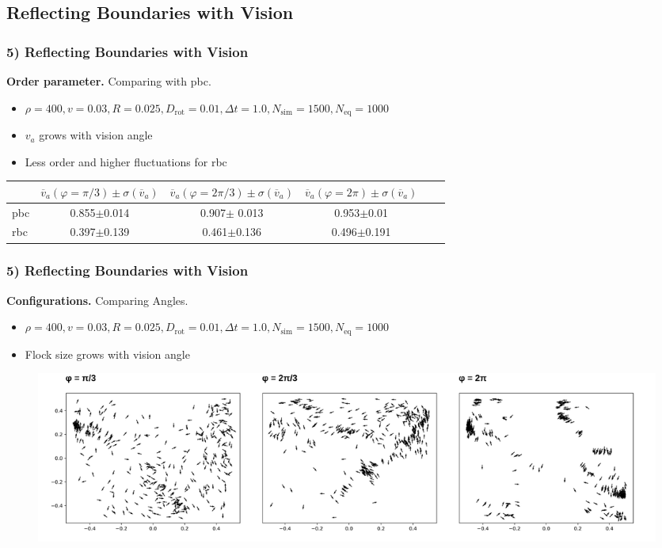 \subsection{Reflecting Boundaries with Vision}

\begin{frame}
	\frametitle{5) Reflecting Boundaries with Vision}
	\textbf{Order parameter.} Comparing with pbc.
	\begin{itemize}
	    \item $\rho = 400, v = 0.03, R = 0.025, D_{\text{rot}} = 0.01, \Delta t = 1.0, N_{\text{sim}} = 1500, N_{\text{eq}} = 1000$
	    \item $v_a$ grows with vision angle
	    \item Less order and higher fluctuations for rbc
	\end{itemize}
	\begin{table}[H]
  		\centering
      
  		\begin{tabular}{@{}l|cccp{4.5cm}l@{}}
    		\toprule
       			& $\overline{v}_a\left(\varphi = \pi/3\right)\pm\sigma\left(\overline{v}_a\right)$ & $\overline{v}_a\left(\varphi = 2\pi/3\right)\pm\sigma\left(\overline{v}_a\right)$ & $\overline{v}_a\left(\varphi = 2\pi\right)\pm\sigma\left(\overline{v}_a\right)$\\ \midrule
       		pbc	& \num{0.855}$\pm$\num{0.014} & \num{0.907}$\pm$ \num{0.013} & \num{0.953}$\pm$\num{0.01} \\
       		rbc & \num{0.397}$\pm$\num{0.139} & \num{0.461}$\pm$\num{0.136} & \num{0.496}$\pm$\num{0.191} \\ \bottomrule
  		\end{tabular}
	\end{table}
\end{frame}

\begin{frame}
	\frametitle{5) Reflecting Boundaries with Vision}
	\textbf{Configurations.} Comparing Angles.
	\begin{itemize}
	     \item $\rho = 400, v = 0.03, R = 0.025, D_{\text{rot}} = 0.01, \Delta t = 1.0, N_{\text{sim}} = 1500, N_{\text{eq}} = 1000$
	    \item Flock size grows with vision angle
	\end{itemize}
	\begin{figure}[H]
  		\includegraphics[width=\textwidth]{images/chapter5/configuration_comp_N_20_L_1.000000_v_0.030000_R_0.030000_D_0.010000.png} 
	\end{figure}
\end{frame}